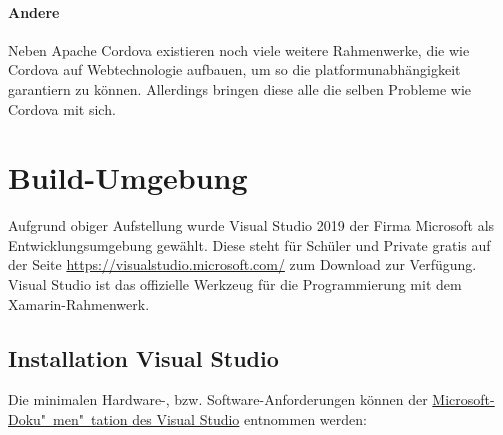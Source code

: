\paragraph{Andere}
Neben Apache Cordova existieren noch viele weitere Rahmenwerke, die wie Cordova auf Webtechnologie aufbauen, um so die platformunabhängigkeit garantiern zu können. Allerdings bringen diese alle die selben Probleme wie Cordova mit sich.

\section{Build-Umgebung}
Aufgrund obiger Aufstellung wurde Visual Studio 2019 der Firma Microsoft als Entwicklungsumgebung gewählt.
Diese steht für Schüler und Private gratis auf der Seite {\href{https://visualstudio.microsoft.com/}{https://visualstudio.microsoft.com/}} zum Download zur Verfügung.
Visual Studio ist das offizielle Werkzeug für die Programmierung mit dem Xamarin-Rahmenwerk.

%
\subsection{Installation Visual Studio} %
Die minimalen Hardware-, bzw. Software-Anforderungen können der \href{https://docs.microsoft.com/en-us/visualstudio/releases/2019/system-requirements}{Microsoft-Doku"~men"~tation des Visual Studio} entnommen werden:

